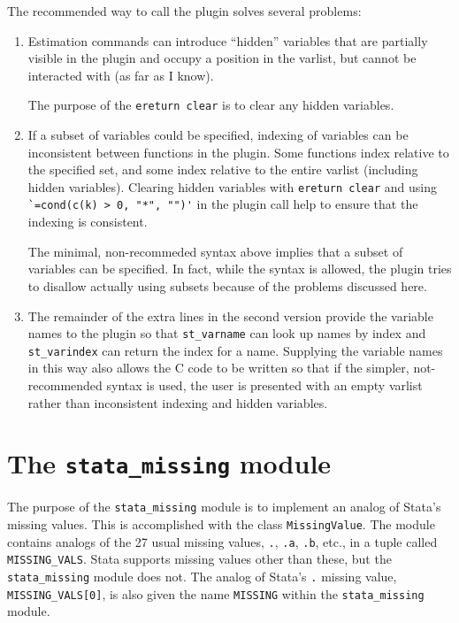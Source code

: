 \documentclass{article}
\begin{document}
The recommended way to call the plugin solves several problems:
	\begin{enumerate}
		\item Estimation commands can introduce ``hidden'' variables that are partially visible in the plugin and occupy a position in the varlist, but cannot be interacted with (as far as I know).
		
		The purpose of the \lstinline{ereturn clear} is to clear any hidden variables.
		
		\item If a subset of variables could be specified, indexing of variables can be inconsistent between functions in the plugin. Some functions index relative to the specified set, and some index relative to the entire varlist (including hidden variables). Clearing hidden variables with \lstinline{ereturn clear} and using \lstinline{`=cond(c(k) > 0, "*", "")'} in the plugin call help to ensure that the indexing is consistent.
		
		The minimal, non-recommeded syntax above implies that a subset of variables can be specified. In fact, while the syntax is allowed, the plugin tries to disallow actually using subsets because of the problems discussed here.
		
		\item The remainder of the extra lines in the second version provide the variable names to the plugin so that \lstinline{st_varname} can look up names by index and \lstinline{st_varindex} can return the index for a name. Supplying the variable names in this way also allows the C code to be written so that if the simpler, not-recommended syntax is used, the user is presented with an empty varlist rather than inconsistent indexing and hidden variables.
	\end{enumerate}
	


\section{The \lstinline$stata_missing$ module} \label{stata_missing}

The purpose of the \lstinline$stata_missing$ module is to implement an analog of Stata's missing values. This is accomplished with the class \lstinline$MissingValue$. The module contains analogs of the 27 usual missing values, \lstinline$.$, \lstinline$.a$, \lstinline$.b$, etc., in a tuple called \lstinline$MISSING_VALS$. Stata supports missing values other than these, but the \lstinline$stata_missing$ module does not. The analog of Stata's \lstinline$.$ missing value, \lstinline$MISSING_VALS[0]$, is also given the name \lstinline$MISSING$ within the \lstinline$stata_missing$ module.
		
\end{document}
